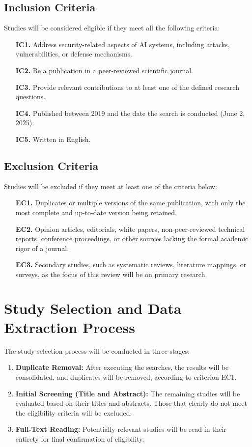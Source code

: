 \documentclass[twoside,brazilian,english]{UNISINOSmonografia}
\begin{document}
\subsection{Inclusion Criteria}
Studies will be considered eligible if they meet all the following criteria:
\begin{itemize}
    \item[\textbf{IC1.}] Address security-related aspects of AI systems, including attacks, vulnerabilities, or defense mechanisms.
    \item[\textbf{IC2.}] Be a publication in a peer-reviewed scientific journal.
    \item[\textbf{IC3.}] Provide relevant contributions to at least one of the defined research questions.
    \item[\textbf{IC4.}] Published between 2019 and the date the search is conducted (June 2, 2025).
    \item[\textbf{IC5.}] Written in English.
\end{itemize}

\subsection{Exclusion Criteria}
Studies will be excluded if they meet at least one of the criteria below:
\begin{itemize}
    \item[\textbf{EC1.}] Duplicates or multiple versions of the same publication, with only the most complete and up-to-date version being retained.
    \item[\textbf{EC2.}] Opinion articles, editorials, white papers, non-peer-reviewed technical reports, conference proceedings, or other sources lacking the formal academic rigor of a journal.
    \item[\textbf{EC3.}] Secondary studies, such as systematic reviews, literature mappings, or surveys, as the focus of this review will be on primary research.
\end{itemize}

\section{Study Selection and Data Extraction Process}

The study selection process will be conducted in three stages:
\begin{enumerate}
    \item \textbf{Duplicate Removal:} After executing the searches, the results will be consolidated, and duplicates will be removed, according to criterion EC1.
    \item \textbf{Initial Screening (Title and Abstract):} The remaining studies will be evaluated based on their titles and abstracts. Those that clearly do not meet the eligibility criteria will be excluded.
    \item \textbf{Full-Text Reading:} Potentially relevant studies will be read in their entirety for final confirmation of eligibility.
\end{enumerate}
\end{document}
